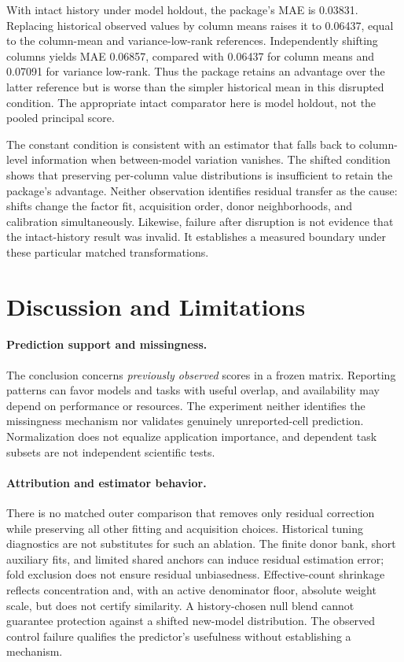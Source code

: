 \documentclass{article}
\begin{document}
With intact history under model holdout, the package's MAE is 0.03831. Replacing historical observed values by column means raises it to 0.06437, equal to the column-mean and variance-low-rank references. Independently shifting columns yields MAE 0.06857, compared with 0.06437 for column means and 0.07091 for variance low-rank. Thus the package retains an advantage over the latter reference but is worse than the simpler historical mean in this disrupted condition. The appropriate intact comparator here is model holdout, not the pooled principal score.

The constant condition is consistent with an estimator that falls back to column-level information when between-model variation vanishes. The shifted condition shows that preserving per-column value distributions is insufficient to retain the package's advantage. Neither observation identifies residual transfer as the cause: shifts change the factor fit, acquisition order, donor neighborhoods, and calibration simultaneously. Likewise, failure after disruption is not evidence that the intact-history result was invalid. It establishes a measured boundary under these particular matched transformations.

\section{Discussion and Limitations}
\paragraph{Prediction support and missingness.}
The conclusion concerns \emph{previously observed} scores in a frozen matrix. Reporting patterns can favor models and tasks with useful overlap, and availability may depend on performance or resources. The experiment neither identifies the missingness mechanism nor validates genuinely unreported-cell prediction. Normalization does not equalize application importance, and dependent task subsets are not independent scientific tests.

\paragraph{Attribution and estimator behavior.}
There is no matched outer comparison that removes only residual correction while preserving all other fitting and acquisition choices. Historical tuning diagnostics are not substitutes for such an ablation. The finite donor bank, short auxiliary fits, and limited shared anchors can induce residual estimation error; fold exclusion does not ensure residual unbiasedness. Effective-count shrinkage reflects concentration and, with an active denominator floor, absolute weight scale, but does not certify similarity. A history-chosen null blend cannot guarantee protection against a shifted new-model distribution. The observed control failure qualifies the predictor's usefulness without establishing a mechanism.
\end{document}
